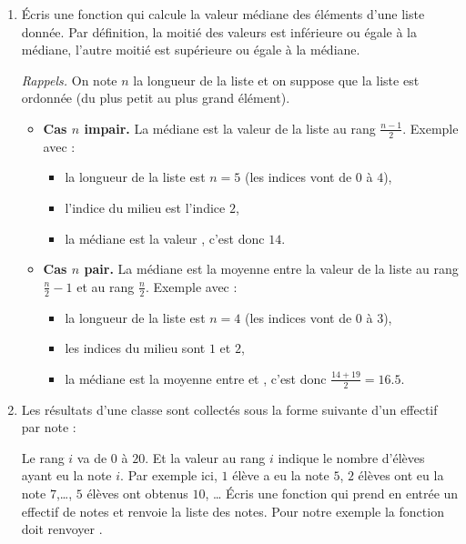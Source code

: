 \documentclass[11pt,class=report,crop=false]{standalone}
\begin{document}
\begin{activite}





\begin{enumerate}
  \item Écris une fonction  qui calcule la valeur médiane des éléments d'une liste donnée. Par définition, la moitié des valeurs est inférieure ou égale à la médiane, l'autre moitié est supérieure ou égale à la médiane.

  \emph{Rappels.} On note $n$ la longueur de la liste et on suppose que la liste est ordonnée (du plus petit au plus grand élément).
  \begin{itemize}
    \item \textbf{Cas $n$ impair.} La médiane est la valeur de la liste au rang $\frac{n-1}{2}$.    
    Exemple avec  :
    \begin{itemize}
      \item la longueur de la liste est $n=5$ (les indices vont de $0$ à $4$),
      \item l'indice du milieu est l'indice $2$,
      \item la médiane est la valeur , c'est donc $14$.
    \end{itemize}
    
    \item \textbf{Cas $n$ pair.} La médiane est la moyenne entre la valeur de la liste au rang $\frac{n}{2}-1$ et au rang $\frac{n}{2}$.
    Exemple avec  :
    \begin{itemize}
      \item la longueur de la liste est $n=4$ (les indices vont de $0$ à $3$),
      \item les indices du milieu sont $1$ et $2$,
      \item la médiane est la moyenne entre  et , c'est donc $\frac{14+19}{2} = 16.5$.
    \end{itemize}    
   \end{itemize} 
   
   
   
     
    \item Les résultats d'une classe sont collectés sous la forme suivante d'un effectif par note : \\
    \centerline{} 
    Le rang $i$ va de $0$ à $20$. Et la valeur au rang $i$ indique le nombre d'élèves ayant eu la note $i$.
    Par exemple ici, $1$ élève a eu la note $5$, $2$ élèves ont eu la note $7$,\ldots , $5$ élèves ont obtenus $10$, \ldots{}  
    Écris une fonction  qui prend en entrée un effectif de notes et renvoie la liste des notes. Pour notre exemple la fonction doit renvoyer \ci{[5,7,7,9,10,10,10,10,10,10,...]}.
       

\end{enumerate}
\end{activite}
\end{document}

